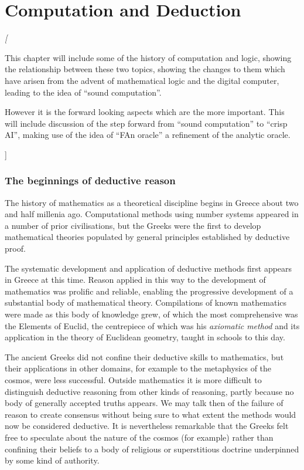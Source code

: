 
\chapter{Computation and Deduction}\label{ComputationAndDeduction}

{\it[

This chapter will include some of the history of computation and logic,
showing the relationship between these two topics, showing the
changes to them which have arisen from the advent of mathematical
logic and the digital computer, leading to the idea of ``sound
computation''. 

However it is the forward looking aspects which are the more important.
This will include discussion of the step forward from ``sound
computation'' to ``crisp AI'', making use of the idea of ``FAn
oracle'' a refinement of the analytic oracle.

]}

\subsection{The beginnings of deductive reason}

The history of mathematics as a theoretical discipline begins in Greece about two and half millenia ago.
Computational methods using number systems appeared in a number of prior civilisations,
but the Greeks were the first to develop mathematical theories populated by general principles
established by deductive proof.

The systematic development and application of deductive methods first appears in Greece at this time.
Reason applied in this way to the development of mathematics was prolific and reliable,
enabling the progressive development of a substantial body of mathematical theory.
Compilations of known mathematics were made as this body of knowledge grew,
of which the most comprehensive was the Elements of Euclid, the centrepiece of which
was his {\it axiomatic method} and its application in the theory of Euclidean geometry,
taught in schools to this day.

The ancient Greeks did not confine their deductive skills to mathematics,
but their applications in other domains, for example to the metaphysics of the cosmos,
were less successful.
Outside mathematics it is more difficult to distinguish deductive reasoning from other
kinds of reasoning, partly because no body of generally accepted truths appears.
We may talk then of the failure of reason to create consensus without being sure to
what extent the methods would now be considered deductive.
It is nevertheless remarkable that the Greeks felt free to speculate about the
nature of the cosmos (for example) rather than confining their beliefs to a body
of religious or superstitious doctrine underpinned by some kind of authority.

